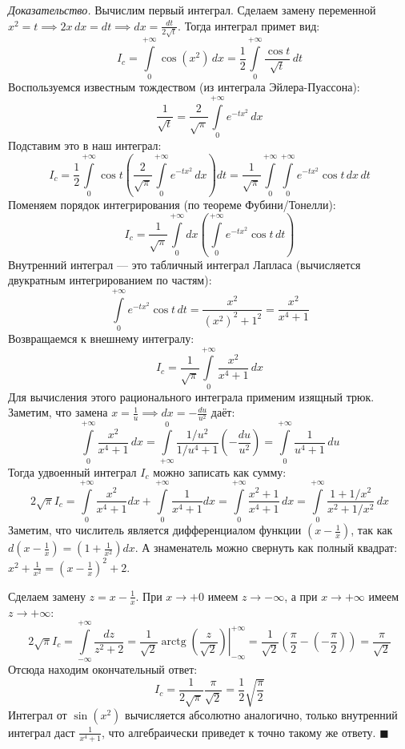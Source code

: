 \documentclass[12pt,a4paper]{article}
\newenvironment{Proof}[1][Доказательство]{\vspace{0.5em}\noindent\textit{#1.}\hspace{0.5em}\ignorespaces}{\hfill$\blacksquare$\vspace{1em}}
\begin{document}
\begin{Proof}
Вычислим первый интеграл. Сделаем замену переменной $x^2 = t \implies 2x \, dx = dt \implies dx = \frac{dt}{2\sqrt{t}}$.
Тогда интеграл примет вид:
$$ I_c = \int\limits_0^{+\infty} \cos(x^2) \, dx = \frac{1}{2} \int\limits_0^{+\infty} \frac{\cos t}{\sqrt{t}} \, dt $$
Воспользуемся известным тождеством (из интеграла Эйлера-Пуассона):
$$ \frac{1}{\sqrt{t}} = \frac{2}{\sqrt{\pi}} \int\limits_0^{+\infty} e^{-tx^2} \, dx $$
Подставим это в наш интеграл:
$$ I_c = \frac{1}{2} \int\limits_0^{+\infty} \cos t \left( \frac{2}{\sqrt{\pi}} \int\limits_0^{+\infty} e^{-tx^2} \, dx \right) dt = \frac{1}{\sqrt{\pi}} \int\limits_0^{+\infty} \int\limits_0^{+\infty} e^{-tx^2} \cos t \, dx \, dt $$
Поменяем порядок интегрирования (по теореме Фубини/Тонелли):
$$ I_c = \frac{1}{\sqrt{\pi}} \int\limits_0^{+\infty} dx \left( \int\limits_0^{+\infty} e^{-tx^2} \cos t \, dt \right) $$
Внутренний интеграл — это табличный интеграл Лапласа (вычисляется двукратным интегрированием по частям):
$$ \int\limits_0^{+\infty} e^{-tx^2} \cos t \, dt = \frac{x^2}{(x^2)^2 + 1^2} = \frac{x^2}{x^4 + 1} $$
Возвращаемся к внешнему интегралу:
$$ I_c = \frac{1}{\sqrt{\pi}} \int\limits_0^{+\infty} \frac{x^2}{x^4 + 1} \, dx $$
Для вычисления этого рационального интеграла применим изящный трюк. Заметим, что замена $x = \frac{1}{u} \implies dx = -\frac{du}{u^2}$ даёт:
$$ \int\limits_0^{+\infty} \frac{x^2}{x^4 + 1} \, dx = \int\limits_{+\infty}^0 \frac{1/u^2}{1/u^4 + 1} \left( -\frac{du}{u^2} \right) = \int\limits_0^{+\infty} \frac{1}{u^4 + 1} \, du $$
Тогда удвоенный интеграл $I_c$ можно записать как сумму:
$$ 2 \sqrt{\pi} I_c = \int\limits_0^{+\infty} \frac{x^2}{x^4+1} dx + \int\limits_0^{+\infty} \frac{1}{x^4+1} dx = \int\limits_0^{+\infty} \frac{x^2 + 1}{x^4 + 1} \, dx = \int\limits_0^{+\infty} \frac{1 + 1/x^2}{x^2 + 1/x^2} \, dx $$
Заметим, что числитель является дифференциалом функции $\left(x - \frac{1}{x}\right)$, так как $d\left(x - \frac{1}{x}\right) = \left(1 + \frac{1}{x^2}\right) dx$. А знаменатель можно свернуть как полный квадрат: $x^2 + \frac{1}{x^2} = \left(x - \frac{1}{x}\right)^2 + 2$. 

Сделаем замену $z = x - \frac{1}{x}$. При $x \to +0$ имеем $z \to -\infty$, а при $x \to +\infty$ имеем $z \to +\infty$:
$$ 2 \sqrt{\pi} I_c = \int\limits_{-\infty}^{+\infty} \frac{dz}{z^2 + 2} = \left. \frac{1}{\sqrt{2}} \operatorname{arctg}\left(\frac{z}{\sqrt{2}}\right) \right|_{-\infty}^{+\infty} = \frac{1}{\sqrt{2}} \left( \frac{\pi}{2} - \left(-\frac{\pi}{2}\right) \right) = \frac{\pi}{\sqrt{2}} $$
Отсюда находим окончательный ответ:
$$ I_c = \frac{1}{2\sqrt{\pi}} \frac{\pi}{\sqrt{2}} = \frac{1}{2} \sqrt{\frac{\pi}{2}} $$
Интеграл от $\sin(x^2)$ вычисляется абсолютно аналогично, только внутренний интеграл даст $\frac{1}{x^4+1}$, что алгебраически приведет к точно такому же ответу.
\end{Proof}
\end{document}
